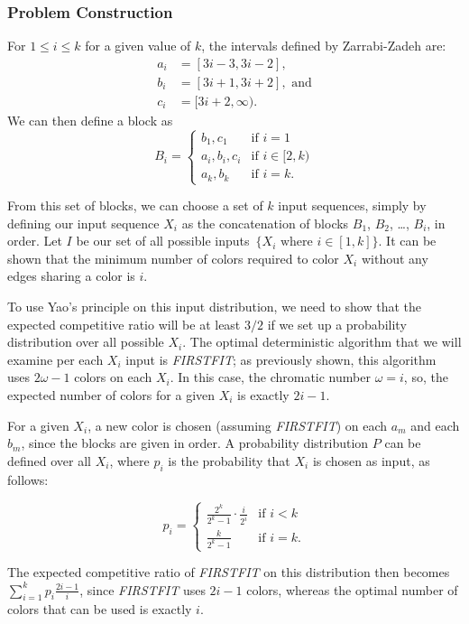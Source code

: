 \subsubsection{Problem Construction}
For $1\le i\le k$ for a given value of $k$, the intervals defined by Zarrabi-Zadeh \cite{zarrabi} are: 
\begin{align*}
	a_i &= [3i-3, 3i-2], \\
	b_i &= [3i+1, 3i+2],\textrm{ and} \\
	c_i &= [3i+2, \infty).
\end{align*}
We can then define a block as
$$B_i = \begin{cases} {b_1, c_1} &\mbox{if } i = 1 \\
{a_i, b_i, c_i} & \mbox{if } i \in [2,k) \\
 {a_k, b_k} &\mbox{if } i = k. \end{cases}$$ 

From this set of blocks, we can choose a set of $k$ input sequences, simply by defining our input sequence $X_i$ as the concatenation of blocks $B_1$, $B_2$, \ldots, $B_i$, in order. Let $I$ be our set of all possible inputs~$\{X_i \text{ where } i \in [1,k]\}$. It can be shown that the minimum number of colors required to color $X_i$ without any edges sharing a color is $i$.

To use Yao's principle on this input distribution, we need to show that the expected competitive ratio will be at least $3/2$ if we set up a probability distribution over all possible $X_i$. The optimal deterministic algorithm that we will examine per each $X_i$ input is \emph{FIRSTFIT}; as previously shown, this algorithm uses $2\omega-1$ colors on each $X_i$. In this case, the chromatic number $\omega=i$, so, the expected number of colors for a given $X_i$ is exactly $2i-1$.

For a given $X_i$, a new color is chosen (assuming \emph{FIRSTFIT}) on each $a_m$ and each $b_m$, since the blocks are given in order. A probability distribution $P$ can be defined over all $X_i$, where $p_i$ is the probability that $X_i$ is chosen as input, as follows:

\[p_i = \begin{cases} \frac{2^k}{2^k-1}\cdot\frac{i}{2^i} &\mbox{if } i < k \\
\frac{k}{2^k-1} & \mbox{if } i = k. 
 \end{cases}\]

The expected competitive ratio of \emph{FIRSTFIT} on this distribution then becomes $\sum_{i=1}^k p_i\frac{2i-1}{i}$, since \emph{FIRSTFIT} uses $2i-1$ colors, whereas the optimal number of colors that can be used is exactly $i$.

